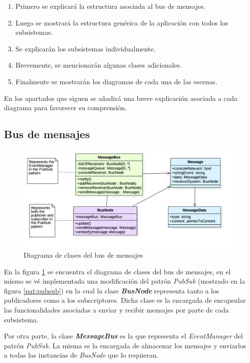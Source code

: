 \begin{enumerate}
	\item Primero se explicará la estructura asociada al bus de mensajes.
	\item Luego se mostrará la estructura genérica de la aplicación con todos los subsistemas.
	\item Se explicarán los subsistemas individualmente.
	\item Brevemente, se mencionarán algunas clases adicionales.
	\item Finalmente se mostrarán los diagramas de cada una de las escenas.
\end{enumerate}

En los apartados que siguen se añadirá una breve explicación asociada a cada diagrama para favorecer su comprensión. 

\subsection{Bus de mensajes}

\begin{figure}
	\centerline{\includegraphics[width=15cm]{otros/UML/png/alld/png/messaging__diagramaDeClases_messaging_11.png}}
	\caption{Diagrama de clases del bus de mensajes}
	\label{class:messageBus}
\end{figure}

En la figura \ref{class:messageBus} se encuentra el diagrama de clases del bus de mensajes, en el mismo se vé implementada una modificación del patrón \textit{PubSub} (mostrado en la figura \ref{pat:pubsub}) en la cual la clase \textbf{\textit{BusNode}} representa tanto a los publicadores como a los subscriptores. Dicha clase es la encargada de encapsular las funcionalidades asociadas a enviar y recibir mensajes por parte de cada subsistema.

\bigskip

Por otra parte, la clase \textbf{\textit{MessageBus}} es la que representa el \textit{EventManager} del patrón \textit{PubSub}. La misma es la encargada de almacenar los mensajes y enviarlos a todas las instancias de \textit{BusNode} que lo requieran.

